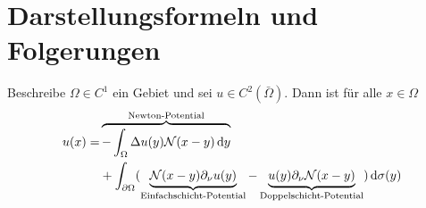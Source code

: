\section{Darstellungsformeln und Folgerungen}

\begin{theorem}[Darstellungsformel]
  \label{theorem:4.6}
  Beschreibe $\Omega\in C^1$ ein Gebiet und sei $u\in C^2(\bar\Omega)$. Dann ist für alle $x\in\Omega$
  \[
  \begin{split}
    u(x)=& \overbrace{-\int_\Omega\Delta
      u(y)\mathcal{N}(x-y)\,\mathrm{d} y}^{\text{Newton-Potential}}\\
    &+\int_{\partial\Omega}(
    \underbrace{\mathcal{N}(x-y)\partial_\nu
      u(y)}_{\text{Einfachschicht-Potential}} -
    \underbrace{u(y)\partial_\nu\mathcal{N}(x-y)}_{\text{Doppelschicht-Potential}}
    )\,\mathrm{d}\sigma(y)
  \end{split}
  \]
\end{theorem}

